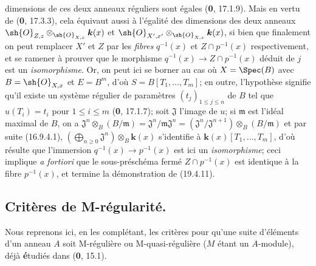 dimensions de ces deux anneaux réguliers sont égales (\textbf{0}, 17.1.9). Mais en vertu de (\textbf{0}, 17.3.3), cela équivaut aussi à l'égalité des dimensions des deux anneaux $\sh{O}_{Z,z}\otimes_{\sh{O}_{X,x}}\boldsymbol{k}(x)$ et $\sh{O}_{X',x'}\otimes_{\sh{O}_{X,x}}\boldsymbol{k}(x)$, si bien que finalement on peut remplacer $X'$ et $Z$ par les \emph{fibres} $q^{-1}(x)$ et $Z\cap p^{-1}(x)$ respectivement, et se ramener à prouver que le morphisme $q^{-1}(x)\to Z\cap p^{-1}(x)$ déduit de $j$ est un \emph{isomorphisme}. Or, on peut ici se borner au cas où $X=\Spec(B)$ avec $B=\sh{O}_{X,x}$ et $E=B^m$, d'où $S=B[T_1,\ldots,T_m]$; en outre, l'hypothèse signifie qu'il existe un système régulier de paramètres $(t_j)_{1\leq j\leq n}$ de $B$ tel que $u(T_i)=t_i$ pour $1\leq i\leq m$ (\textbf{0}, 17.1.7); soit $\mathfrak J$ l'image de $u$; si $\mathfrak m$ est l'idéal maximal de $B$, on a $\mathfrak J^n\otimes_B(B/\mathfrak m)=\mathfrak J^n/\mathfrak m\mathfrak J^n=(\mathfrak J^n/\mathfrak J^{n+1})\otimes_B(B/\mathfrak m)$ et par suite (16.9.4.1), $(\bigoplus_{n\geq0}\mathfrak J^n)\otimes_B\boldsymbol{k}(x)$ s'identifie à $\boldsymbol{k}(x)[T_1,\ldots,T_m]$, d'où résulte que l'immersion $q^{-1}(x)\to p^{-1}(x)$ est ici un \emph{isomorphisme}; ceci implique \emph{a fortiori} que le sous-préschéma fermé $Z\cap p^{-1}(x)$ est identique à la fibre $p^{-1}(x)$, et termine la démonstration de (19.4.11).

\subsection{Critères de M-régularité.}

Nous reprenons ici, en les complétant, les critères pour qu'une suite d'éléments d'un anneau $A$ soit M-régulière ou M-quasi-régulière ($M$ étant un $A$-module), déjà \textbf{é}tudiés dans (\textbf{0}, 15.1).

